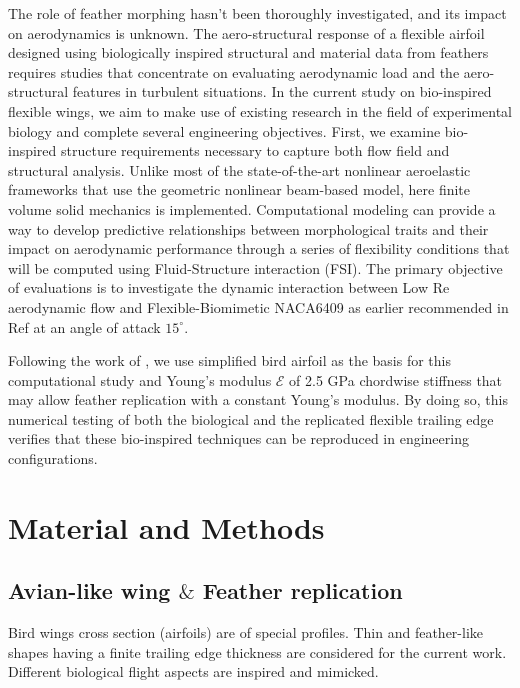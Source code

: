 \documentclass[conf]{new-aiaa}
\begin{document}
The role of feather morphing hasn't been thoroughly investigated, and its impact on aerodynamics is unknown.
%
The aero-structural response of a flexible airfoil designed using biologically inspired structural and material data from feathers requires studies that concentrate on evaluating aerodynamic load and the aero-structural features in turbulent situations.
%
In the current study on bio-inspired flexible wings, we aim to make use of existing research in the field of experimental biology and complete several engineering objectives.
%
First, we examine bio-inspired structure requirements necessary to capture both flow field and structural analysis.
%
Unlike most of the state-of-the-art nonlinear aeroelastic frameworks that use the geometric nonlinear beam-based model, here finite volume solid mechanics is implemented.
%
Computational modeling can provide a way to develop predictive relationships between morphological traits and their impact on aerodynamic performance through a series of flexibility conditions that will be computed using Fluid-Structure interaction (FSI).
%
The primary objective of evaluations is to investigate the dynamic interaction between Low Re aerodynamic flow and Flexible-Biomimetic NACA6409 as earlier recommended in Ref \cite{gamble2020load} at an angle of attack $15^{\circ}$.
%

%
Following the work of \citet{gamble2020load}, we use simplified bird airfoil as the basis for this computational study and Young's modulus $\mathcal{E}$ of 2.5 GPa chordwise stiffness that may allow feather replication with a constant Young's modulus.
%
By doing so, this numerical testing of both the biological and the replicated flexible trailing edge verifies that these
bio-inspired techniques can be reproduced in engineering configurations.

\newpage
\section{Material and Methods}


\subsection{Avian-like wing $\&$ Feather replication}

Bird wings cross section (airfoils) are of special profiles.
%
Thin and feather-like shapes having a finite trailing edge thickness are considered for the current work. 
%
Different biological flight aspects are inspired and mimicked. 
\end{document}
